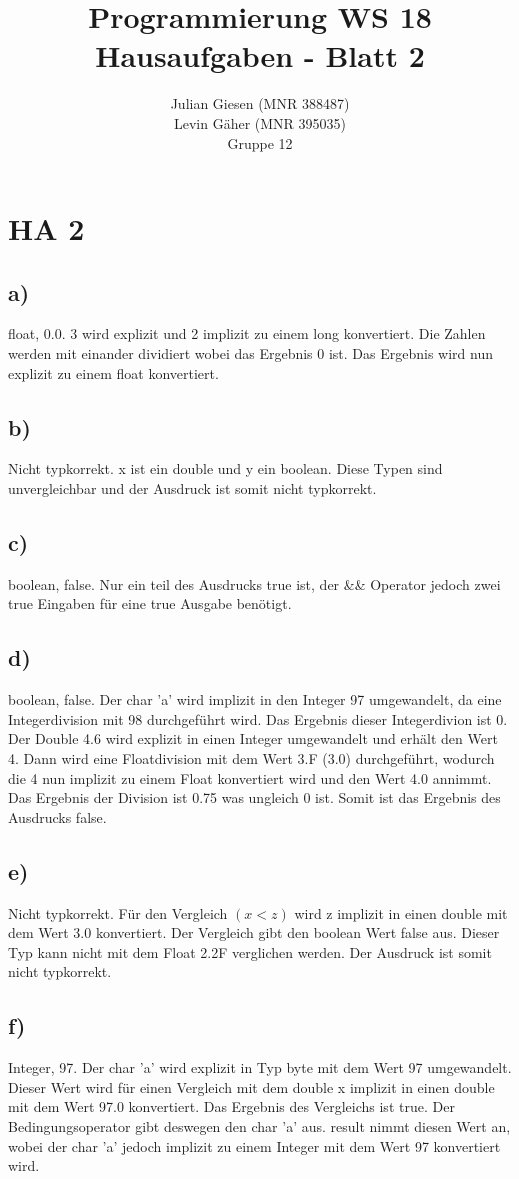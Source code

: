 \documentclass[a4paper]{article}
\title{ Programmierung WS 18 \\ Hausaufgaben - Blatt 2 }
\author{ Julian Giesen (MNR 388487) \\
Levin Gäher (MNR 395035) \\
Gruppe 12 }
\date{  }
\begin{document}
\maketitle

\section* { HA 2 }
\subsection*{ a) } 
float, 0.0. 3 wird explizit und 2 implizit zu einem long konvertiert. Die Zahlen werden mit einander dividiert wobei das Ergebnis 0 ist. Das Ergebnis wird nun explizit zu einem float konvertiert.
\subsection*{b)}
Nicht typkorrekt. x ist ein double und y ein boolean. Diese Typen sind unvergleichbar und der Ausdruck ist somit nicht typkorrekt.
\subsection*{c)}
boolean, false. Nur ein teil des Ausdrucks true ist, der \&\& Operator jedoch zwei true Eingaben für eine true Ausgabe benötigt.
\subsection*{d)}
boolean, false. Der char 'a' wird implizit in den Integer 97 umgewandelt, da eine Integerdivision mit 98 durchgeführt wird. Das Ergebnis dieser Integerdivion ist 0. Der Double 4.6 wird explizit in einen Integer umgewandelt und erhält den Wert 4. Dann wird eine Floatdivision mit dem Wert 3.F (3.0) durchgeführt, wodurch die 4 nun implizit zu einem Float konvertiert wird und den Wert 4.0 annimmt. Das Ergebnis der Division ist 0.75 was ungleich 0 ist. Somit ist das Ergebnis des Ausdrucks false. 
\subsection*{e)}
Nicht typkorrekt. Für den Vergleich $(x < z)$ wird z implizit in einen double mit dem Wert 3.0 konvertiert. Der Vergleich gibt den boolean Wert false aus. Dieser Typ kann nicht mit dem Float 2.2F verglichen werden. Der Ausdruck ist somit nicht typkorrekt.
\subsection*{f)}
Integer, 97. Der char 'a' wird explizit in Typ byte mit dem Wert 97 umgewandelt. Dieser Wert wird für einen Vergleich mit dem double x implizit in einen double mit dem Wert 97.0 konvertiert. Das Ergebnis des Vergleichs ist true. Der Bedingungsoperator gibt deswegen den char 'a' aus. result nimmt diesen Wert an, wobei der char 'a' jedoch implizit zu einem Integer mit dem Wert 97 konvertiert wird.
\end{document}
